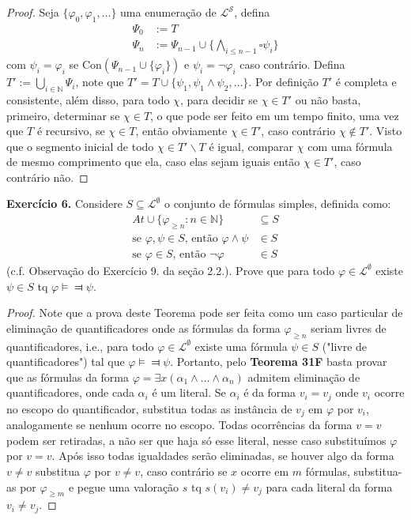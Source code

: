 \documentclass[11pt]{article}
\newcommand{\mc}[1]{\mathcal{#1}}
\newcommand{\mbb}[1]{\mathbb{#1}}
\begin{document}
\begin{proof}
    Seja $\{\varphi_0,\varphi_1,\dots\}$ uma enumeração de $\mc{L}^\mc{S}$, defina
    \begin{align*}
        \Psi_0 & := T\\
        \Psi_n & := \Psi_{n-1}\cup\bigl\{\bigwedge_{i\leq n-1}\square\psi_i\bigr\}
    \end{align*}
    com $\psi_i=\varphi_i$ se $\text{Con}(\Psi_{n-1}\cup\{\varphi_i\})$ e $\psi_i=\neg\varphi_i$ caso contrário. Defina $T':=\bigcup_{i\in\mbb{N}}\Psi_i$, note que $T'=T\cup\{\psi_1,\psi_1\wedge\psi_2,\dots\}$. Por definição $T'$ é completa e consistente, além disso, para todo $\chi$, para decidir se $\chi\in T'$ ou não basta, primeiro, determinar se $\chi\in T$, o que pode ser feito em um tempo finito, uma vez que $T$ é recursivo, se $\chi\in T$, então obviamente $\chi\in T'$, caso contrário $\chi\notin T'$. Visto que o segmento inicial de todo $\chi\in T'\backslash T$ é igual, comparar $\chi$ com uma fórmula de mesmo comprimento que ela, caso elas sejam iguais então $\chi\in T'$, caso contrário não.
\end{proof}

\begin{shaded}
\textbf{Exercício 6.} Considere $S\subseteq\mc{L}^\emptyset$ o conjunto de fórmulas simples, definida como:
\begin{align*}
    At\cup\{\varphi_{\geq n}:n\in\mbb{N}\} & \subseteq S\\
    \text{se }\varphi,\psi\in S\text{, então }\varphi\wedge\psi & \in S\\
    \text{se }\varphi\in S\text{, então }\neg\varphi & \in S
\end{align*}
(c.f. Observação do Exercício 9. da seção 2.2.). Prove que para todo $\varphi\in\mc{L}^\emptyset$ existe $\psi\in S$ tq $\varphi\vDash\Dashv\psi$.
\end{shaded}

\begin{proof}
    Note que a prova deste Teorema pode ser feita como um caso particular de eliminação de quantificadores onde as fórmulas da forma $\varphi_{\geq n}$ seriam livres de quantificadores, i.e., para todo $\varphi\in\mc{L}^\emptyset$ existe uma fórmula $\psi\in S$ ("livre de quantificadores") tal que $\varphi\vDash\Dashv\psi$. Portanto, pelo \textbf{Teorema 31F} basta provar que as fórmulas da forma $\varphi=\exists x(\alpha_1\wedge\dots\wedge\alpha_n)$ admitem eliminação de quantificadores, onde cada $\alpha_i$ é um literal. Se $\alpha_i$ é da forma $v_i=v_j$ onde $v_i$ ocorre no escopo do quantificador, substitua todas as instância de $v_j$ em $\varphi$ por $v_i$, analogamente se nenhum ocorre no escopo. Todas ocorrências da forma $v=v$ podem ser retiradas, a não ser que haja só esse literal, nesse caso substituímos $\varphi$ por $v=v$. Após isso todas igualdades serão eliminadas, se houver algo da forma $v\neq v$ substitua $\varphi$ por $v\neq v$, caso contrário se $x$ ocorre em $m$ fórmulas, substitua-as por $\varphi_{\geq m}$ e pegue uma valoração $s$ tq $s(v_i)\neq v_j$ para cada literal da forma $v_i\neq v_j$.
\end{proof}
\end{document}
